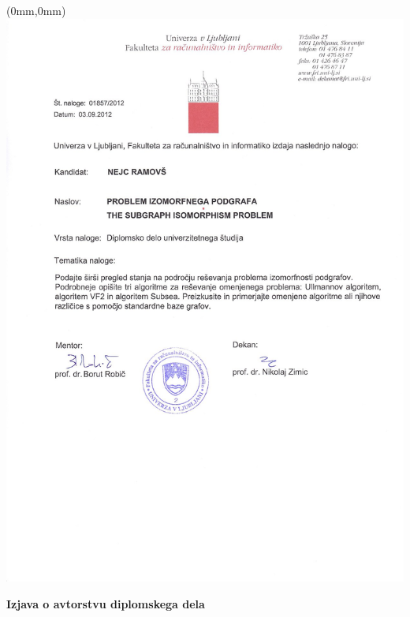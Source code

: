 \documentclass[a4paper, 12pt, ]{book}
\newcommand{\clearemptydoublepage}{\newpage{\pagestyle{empty}\cleardoublepage}}
\begin{document}
\newpage
\thispagestyle{empty}
\begin{textblock*}{\paperwidth}(0mm,0mm)
   \noindent\includegraphics[width=\paperwidth,height=\paperheight]{img/title1.jpg}
\end{textblock*}
\mbox{}\newpage

	
	\clearemptydoublepage




	\vspace*{1cm}
	\begin{center} 
	{\Large \textbf{\sc Izjava o avtorstvu diplomskega dela}}
	\end{center}
	
\end{document}
